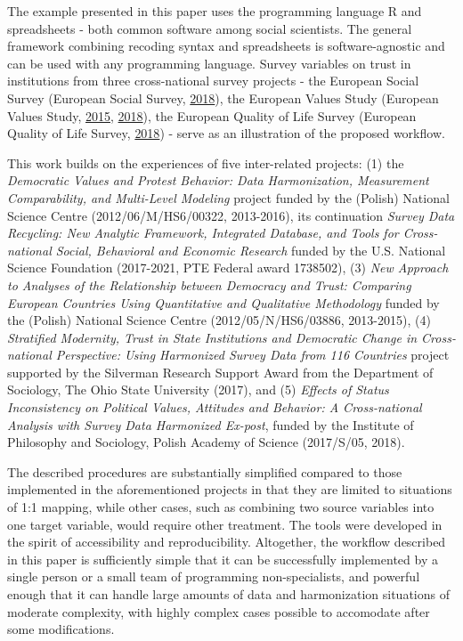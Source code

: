 \documentclass[12pt,]{article}
\begin{document}
The example presented in this paper uses the programming language R and spreadsheets - both common software among social scientists. The general framework combining recoding syntax and spreadsheets is software-agnostic and can be used with any programming language. Survey variables on trust in institutions from three cross-national survey projects - the European Social Survey (European Social Survey, \protect\hyperlink{ref-ESS2018}{2018}), the European Values Study (European Values Study, \protect\hyperlink{ref-EVS2015}{2015}, \protect\hyperlink{ref-EVS2018}{2018}), the European Quality of Life Survey (European Quality of Life Survey, \protect\hyperlink{ref-EQLS2018}{2018}) - serve as an illustration of the proposed workflow.

This work builds on the experiences of five inter-related projects: (1) the \emph{Democratic Values and Protest Behavior: Data Harmonization, Measurement Comparability, and Multi-Level Modeling} project funded by the (Polish) National Science Centre (2012/06/M/HS6/00322, 2013-2016), its continuation \emph{Survey Data Recycling: New Analytic Framework, Integrated Database, and Tools for Cross-national Social, Behavioral and Economic Research} funded by the U.S. National Science Foundation (2017-2021, PTE Federal award 1738502), (3) \emph{New Approach to Analyses of the Relationship between Democracy and Trust: Comparing European Countries Using Quantitative and Qualitative Methodology} funded by the (Polish) National Science Centre (2012/05/N/HS6/03886, 2013-2015), (4) \emph{Stratified Modernity, Trust in State Institutions and Democratic Change in Cross-national Perspective: Using Harmonized Survey Data from 116 Countries} project supported by the Silverman Research Support Award from the Department of Sociology, The Ohio State University (2017), and (5) \emph{Effects of Status Inconsistency on Political Values, Attitudes and Behavior: A Cross-national Analysis with Survey Data Harmonized Ex-post}, funded by the Institute of Philosophy and Sociology, Polish Academy of Science (2017/S/05, 2018).

The described procedures are substantially simplified compared to those implemented in the aforementioned projects in that they are limited to situations of 1:1 mapping, while other cases, such as combining two source variables into one target variable, would require other treatment. The tools were developed in the spirit of accessibility and reproducibility. Altogether, the workflow described in this paper is sufficiently simple that it can be successfully implemented by a single person or a small team of programming non-specialists, and powerful enough that it can handle large amounts of data and harmonization situations of moderate complexity, with highly complex cases possible to accomodate after some modifications.
\end{document}
